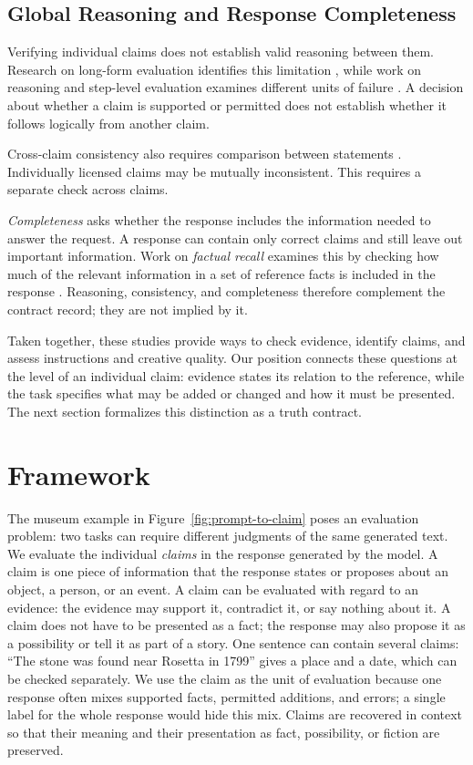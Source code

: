\documentclass{clv2025}
\begin{document}
\subsection{Global Reasoning and Response Completeness}\label{subsec:global}

Verifying individual claims does not establish valid reasoning between them.
Research on long-form evaluation identifies this limitation
\citep{yan_logicscore_2026}, while work on reasoning and step-level evaluation
examines different units of failure
\citep{arcuschin_cot_2025,pham_grace_2026}.
A decision about whether a claim is supported or permitted does not
establish whether it follows logically from another claim.

Cross-claim consistency also requires comparison between statements
\citep{mundler_selfcontradictory_2024}. Individually licensed claims may be
mutually inconsistent. This requires a separate check across claims.

\emph{Completeness} asks whether the response includes the information
needed to answer the request. A response can contain only correct claims
and still leave out important information. Work on \emph{factual recall}
examines this by checking how much of the relevant information in a set of
reference facts is included in the response
\citep{liu_verifact_2025,jafari_recall_2026}.
Reasoning, consistency, and completeness therefore complement the contract
record; they are not implied by it.

Taken together, these studies provide ways to check evidence, identify claims,
and assess instructions and creative quality. Our position connects these
questions at the level of an individual claim: evidence states its
relation to the reference, while the task specifies what may be added or
changed and how it must be presented. The next section formalizes this
distinction as a truth contract.

\section{Framework}\label{sec:framework}

The museum example in Figure~\ref{fig:prompt-to-claim} poses an evaluation
problem: two tasks can require different judgments of the same generated
text. We evaluate the individual \emph{claims} in the response generated
by the model.
A claim is one piece of information that the response states
or proposes about an object, a person, or an event. A claim can be evaluated with regard to an evidence: the evidence may support it, contradict it, or say nothing
about it. A claim does not have to be presented as a fact; the response
may also propose it as a possibility or tell it as part of a story.
One sentence can contain several claims: ``The stone was found near
Rosetta in 1799'' gives a place and a date, which can be checked
separately. We use the claim as the unit of evaluation because one
response often mixes supported facts, permitted additions, and errors; a
single label for the whole response would hide this mix. Claims are
recovered in context so that their meaning and their presentation as fact,
possibility, or fiction are preserved.
\end{document}
